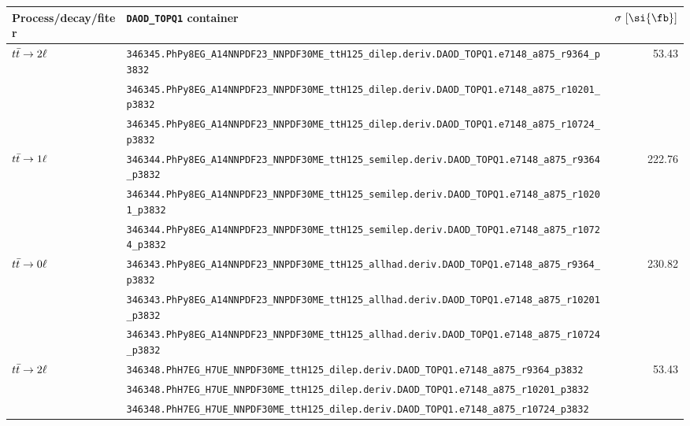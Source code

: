 \begin{table}[htbp]\centering
{\tiny
\begin{tabular}{l|l|r}
\toprule
\hline
Process/decay/fiter & \verb|DAOD_TOPQ1| container                                                    & $\mathrm{\sigma~[\si{\fb}]}$ \\ \hline\hline
\multirow{3}{*}{$t\bar{t}\to\mathrm{2\ell}$}     & \verb|346345.PhPy8EG_A14NNPDF23_NNPDF30ME_ttH125_dilep.deriv.DAOD_TOPQ1.e7148_a875_r9364_p3832|    & \multirow{3}{*}{53.43} \\
                                               & \verb|346345.PhPy8EG_A14NNPDF23_NNPDF30ME_ttH125_dilep.deriv.DAOD_TOPQ1.e7148_a875_r10201_p3832|   &  \\
                                               & \verb|346345.PhPy8EG_A14NNPDF23_NNPDF30ME_ttH125_dilep.deriv.DAOD_TOPQ1.e7148_a875_r10724_p3832|   &  \\ \hline
\multirow{3}{*}{$t\bar{t}\to\mathrm{1\ell}$}     & \verb|346344.PhPy8EG_A14NNPDF23_NNPDF30ME_ttH125_semilep.deriv.DAOD_TOPQ1.e7148_a875_r9364_p3832|  & \multirow{3}{*}{222.76} \\
                                               & \verb|346344.PhPy8EG_A14NNPDF23_NNPDF30ME_ttH125_semilep.deriv.DAOD_TOPQ1.e7148_a875_r10201_p3832| &  \\
                                               & \verb|346344.PhPy8EG_A14NNPDF23_NNPDF30ME_ttH125_semilep.deriv.DAOD_TOPQ1.e7148_a875_r10724_p3832| &  \\ \hline
\multirow{3}{*}{$t\bar{t}\to\mathrm{0\ell}$}     & \verb|346343.PhPy8EG_A14NNPDF23_NNPDF30ME_ttH125_allhad.deriv.DAOD_TOPQ1.e7148_a875_r9364_p3832|   & \multirow{3}{*}{230.82} \\
                                               & \verb|346343.PhPy8EG_A14NNPDF23_NNPDF30ME_ttH125_allhad.deriv.DAOD_TOPQ1.e7148_a875_r10201_p3832|  &  \\
                                               & \verb|346343.PhPy8EG_A14NNPDF23_NNPDF30ME_ttH125_allhad.deriv.DAOD_TOPQ1.e7148_a875_r10724_p3832|  &  \\ \hline
\hline
\multirow{3}{*}{$t\bar{t}\to\mathrm{2\ell}$}     & \verb|346348.PhH7EG_H7UE_NNPDF30ME_ttH125_dilep.deriv.DAOD_TOPQ1.e7148_a875_r9364_p3832|    & \multirow{3}{*}{53.43} \\
                                               & \verb|346348.PhH7EG_H7UE_NNPDF30ME_ttH125_dilep.deriv.DAOD_TOPQ1.e7148_a875_r10201_p3832|   &  \\
                                               & \verb|346348.PhH7EG_H7UE_NNPDF30ME_ttH125_dilep.deriv.DAOD_TOPQ1.e7148_a875_r10724_p3832|   &  \\ \hline

\end{tabular}}
\end{table}
